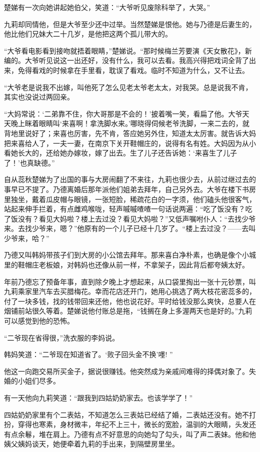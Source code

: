 \par 楚娣有一次向她讲起她伯父，笑道：“大爷听见废除科举了，大哭。”
\par 九莉却同情他，但是大爷至少还中过举。当然楚娣是恨他。她与乃德是后妻生的，他比他们兄妹大二十几岁，是他把这两个孤儿带大的。
\par “大爷看电影看到接吻就捂着眼睛，”楚娣说。“那时候梅兰芳要演《天女散花》，新编的。大爷听见说这一出还好，没有什么，我可以去看。我高兴得把戏词全背了出来，免得看戏的时候拿在手里看，耽误了看戏。临时不知道为什么，又不让去。
\par “大爷老是说我不出嫁，叫他死了怎么见老太爷老太太，对我哭。总是说我不肯，其实也没说过两回亲。
\par “大妈常说：‘二弟靠不住，你大哥那是不会的！’披着嘴一笑，看扁了他。大爷天天晚上眯\MuQi 着眼睛叫‘来喜啊！拿洗脚水来。’哪晓得伺候老爷洗脚，一来二去的，就背地里说好了；来喜也厉害，先不肯，答应她另外住，知道太太厉害。就告诉大妈把来喜给人了，一夫一妻，在南京下关开鞋帽庄的，说得有名有姓。大妈因为从小看她长大的，还给她办嫁妆，嫁了出去。生了儿子还告诉她：‘来喜生了儿子了！’也真缺德。”
\par 自从蕊秋楚娣为了出国的事与大房闹翻了不来往，九莉也很少去，从前过继过去的事早已不提了。乃德离婚后那年派他们姐弟去拜年，自己另外去。大爷在楼下书房里独坐，戴着瓜皮帽与眼镜，一张短脸，稀疏花白的一字须，他们磕头他很客气，站起来伸手拦着，有点雌鸡喉咙，轻声嘁嘁喳喳一句话说两遍：“吃了饭没有？吃了饭没有？看见大妈啦？楼上去过没？看见大妈啦？”又低声嘱咐仆人：“去找少爷来。去找少爷来，嗯？”他原有的一个儿子已经十几岁了。“楼上去过没？——去叫少爷来，哈？”
\par 乃德又叫韩妈带孩子们到大房的小公馆去拜年。那来喜白净朴素，也确是像个小城里的鞋帽庄老板娘，对韩妈也还像从前一样，不拿架子，因此背后都夸姨太好。
\par 年前乃德忘了预备年事，直到除夕晚上才想起来，从口袋里掏出一张十元钞票，叫九莉乘家里汽车去买腊梅花。幸而花店还开门，她用心挑选了两大枝花密蕊多的，付了一块多钱，找的钱带回来还他，他也说花好。平时给钱没那么爽快，总要人在烟铺前站很久等着。楚娣说他付账总是拖，“钱搁在身上多渥两天也是好的。”九莉可以感觉到他的恐怖。
\par “二爷现在省得很，”洗衣服的李妈说。
\par 韩妈笑道：“二爷现在知道省了。‘败子回头金不换’嚜! ”
\par 他这一向跑交易所买金子，据说很赚钱。他突然成为亲戚间难得的择偶对象了。失婚的小姐们尽多。
\par 有一天他向九莉笑道：“跟我到四姑奶奶家去。也该学学了！”
\par 四姑奶奶家里有个二表姑，不知道怎么三表姑已经结了婚，二表姑还没有。她不打扮，穿得也寒素，身材微丰，年纪不上三十，微长的宽脸，温驯的大眼睛，头发还有点余鬈，堆在肩上。乃德有点不好意思的向她勾了勾头，叫了声二表妹。他和他姨父姨妈谈天，她便牵着九莉的手出来，到隔壁房里坐。
